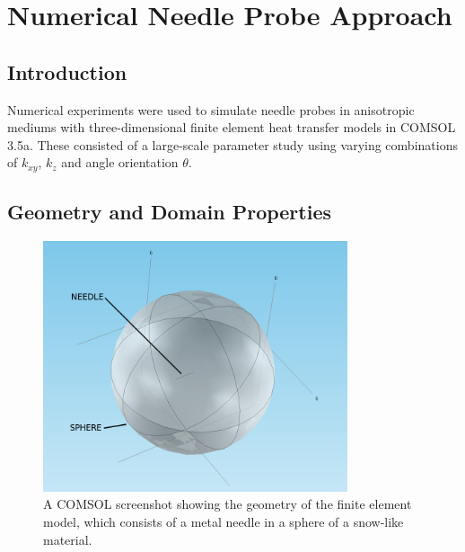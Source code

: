 \chapter{Numerical Needle Probe Approach}
\label{sec:numerical-np}
\bigskip

\section{Introduction} 
\label{sec:numerical-np:introduction}

Numerical experiments were used to simulate needle probes in anisotropic mediums with
three-dimensional finite element heat transfer models in COMSOL 3.5a. These
consisted of a large-scale parameter study using varying combinations of \(k_{xy}\), \(k_z\) and angle orientation \(\theta\).

\section{Geometry and Domain Properties}
\label{sec:numerical-np:domain}

\begin{figure}[h]
\centering
\includegraphics[width=0.8\textwidth]{fig/domain_2.png}
\caption{A COMSOL screenshot showing the geometry of the finite element model, which consists of a metal needle in a sphere of a snow-like material.}
\label{fig:domain}
\end{figure}


